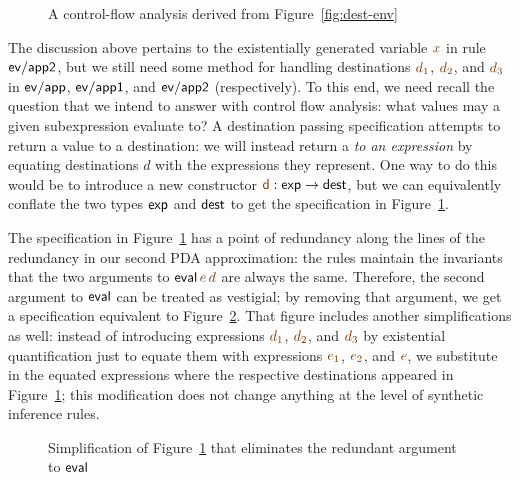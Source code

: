 \begin{figure}[t]
\caption{A control-flow analysis derived from Figure~\ref{fig:dest-env}}
\label{fig:dest-cfa-1}
\end{figure}

The discussion above pertains to the existentially generated variable
$\lf{x}$ in rule ${\sf ev/app2}$, but we still need some method for
handling destinations $\lf{d_1}$, $\lf{d_2}$, and $\lf{d_3}$ in 
${\sf ev/app}$, ${\sf
  ev/app1}$, and ${\sf ev/app2}$ (respectively). To
this end, we need recall the question that we intend to answer with
control flow analysis: what values may a given subexpression evaluate
to? A destination passing specification attempts to return a value to
a destination: we will instead return a {\it to an expression} by
equating destinations $d$ with the expressions they represent. One way
to do this would be to introduce a new constructor $\lf{\sf d}: {\sf
  exp} \rightarrow {\sf dest}$, but we can equivalently conflate the
two types ${\sf exp}$ and ${\sf dest}$ to get the specification in
Figure~\ref{fig:dest-cfa-1}.


The specification in Figure~\ref{fig:dest-cfa-1} has a point of
redundancy along the lines of the redundancy in our second PDA
approximation: the rules maintain the invariants that the two
arguments to ${\sf eval}\,\lf{e}\,\lf{d}$ are always the same. Therefore, the
second argument to ${\sf eval}$ can be treated as vestigial; by
removing that argument, we get a specification equivalent to
Figure~\ref{fig:dest-cfa-2}. That figure includes another
simplifications as well: instead of introducing expressions $\lf{d_1}$,
$\lf{d_2}$, and $\lf{d_3}$ by existential quantification just to equate them
with expressions $\lf{e_1}$, $\lf{e_2}$, and $\lf{e}$, 
we substitute in the equated
expressions where the respective destinations appeared in
Figure~\ref{fig:dest-cfa-1}; this modification does not change
anything at the level of  synthetic inference rules.

\begin{figure}[t]
\caption{Simplification of Figure~\ref{fig:dest-cfa-1} that
  eliminates the redundant argument to ${\sf eval}$}
\label{fig:dest-cfa-2}
\end{figure}

